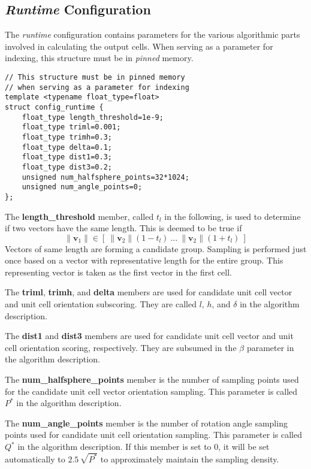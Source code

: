 \documentclass[a4paper,10pt]{article}
\newcommand{\vect}[1]{\mathbf{#1}}
\begin{document}
\subsection{\emph{Runtime} Configuration}

The \emph{runtime} configuration contains parameters for the various algorithmic parts involved in calculating the output cells. When serving as a parameter for indexing, this structure must be in \emph{pinned} memory.
%
\begin{lstlisting}
// This structure must be in pinned memory
// when serving as a parameter for indexing
template <typename float_type=float>
struct config_runtime {
    float_type length_threshold=1e-9;
    float_type triml=0.001;
    float_type trimh=0.3;
    float_type delta=0.1;
    float_type dist1=0.3;
    float_type dist3=0.2;
    unsigned num_halfsphere_points=32*1024;
    unsigned num_angle_points=0;
};
\end{lstlisting}
%
The \textbf{length\_threshold} member, called $t_l$ in the following, is used to determine if two vectors have the same length. This is deemed to be true if
%
\[
\|\vect{v}_1\| \in \left [\:\|\vect{v}_2\|(1-t_l)\ \hdots\ \|\vect{v}_2\|(1+t_l)\: \right ]
\]
%
Vectors of same length are forming a candidate group. Sampling is performed just once based on a vector with representative length for the entire group. This representing vector is taken as the first vector in the first cell.

The \textbf{triml}, \textbf{trimh}, and \textbf{delta} members are used for candidate unit cell vector and unit cell orientation subscoring. They are called $l$, $h$, and $\delta$ in the algorithm description.

The \textbf{dist1} and \textbf{dist3} members are used for candidate unit cell vector and unit cell orientation scoring, respectively. They are subsumed in the $\beta$ parameter in the algorithm description.

The \textbf{num\_halfsphere\_points} member is the number of sampling points used for the candidate unit cell vector orientation sampling. This parameter is called $P^*$ in the algorithm description.

The \textbf{num\_angle\_points} member is the number of rotation angle sampling points used for candidate unit cell orientation sampling. This parameter is called $Q^*$ in the algorithm description. If this member is set to $0$, it will be set automatically to $2.5\,\sqrt{P^*}$ to approximately maintain the sampling density.
\end{document}
